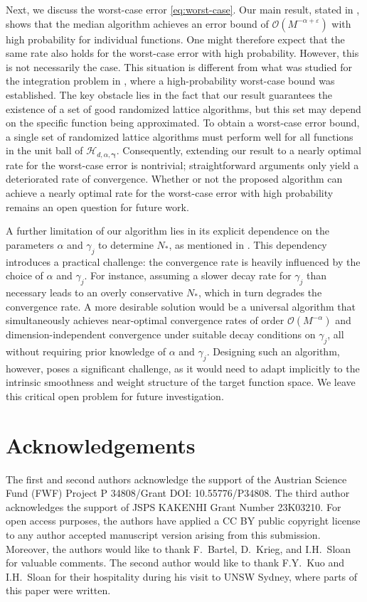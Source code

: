 \documentclass[pdflatex,sn-basic,Numbered]{sn-jnl}%
\newcommand{\bsgamma}{\boldsymbol{\gamma}}
\newcommand{\Hcal}{\mathcal{H}}
\theoremstyle{thmstyleone}%
\theoremstyle{thmstyletwo}%
\begin{document}
Next, we discuss the worst-case error \eqref{eq:worst-case}.
Our main result, stated in , shows that the median algorithm achieves an error bound of $\mathcal{O}(M^{-\alpha+\varepsilon})$ with high probability for individual functions. One might therefore expect that the same rate also holds for the worst-case error with high probability. However, this is not necessarily the case.
This situation is different from what was studied for the integration problem in \cite{goda2022free}, where a high-probability worst-case bound was established.
The key obstacle lies in the fact that our result guarantees the existence of a set of good randomized lattice algorithms, but this set may depend on the specific function being approximated. 
To obtain a worst-case error bound, a single set of randomized lattice algorithms must perform well for all functions in the unit ball of $\Hcal_{d,\alpha,\bsgamma}$. Consequently, extending our result to a nearly optimal rate for the worst-case error is nontrivial; straightforward arguments only yield a deteriorated rate of convergence.
Whether or not the proposed algorithm can achieve a nearly optimal rate for the worst-case error with high probability remains an open question for future work.

A further limitation of our algorithm lies in its explicit dependence on the parameters $\alpha$ and $\gamma_j$ to determine $N_*$, as mentioned in . This dependency introduces a practical challenge: the convergence rate is heavily influenced by the choice of $\alpha$ and $\gamma_j$. For instance, assuming a slower decay rate for $\gamma_j$ than necessary leads to an overly conservative $N_*$, which in turn degrades the convergence rate. A more desirable solution would be a universal algorithm that simultaneously achieves near-optimal convergence rates of order $\mathcal{O}(M^{-\alpha})$ and dimension-independent convergence under suitable decay conditions on $\gamma_j$, all without requiring prior knowledge of $\alpha$ and $\gamma_j$. Designing such an algorithm, however, poses a significant challenge, as it would need to adapt implicitly to the intrinsic smoothness and weight structure of the target function space. We leave this critical open problem for future investigation.

\section*{Acknowledgements}
The first and second authors acknowledge the support of the Austrian Science Fund (FWF) Project  P 34808/Grant DOI: 10.55776/P34808. The third author acknowledges the support of JSPS KAKENHI Grant Number 23K03210. For open access purposes, the authors have applied a CC BY public copyright license to any author accepted manuscript version arising from this submission. Moreover, the authors would like to thank F.~Bartel, D.~Krieg, and I.H.~Sloan for valuable comments. The second author would like to thank F.Y.~Kuo and I.H.~Sloan for their hospitality during his visit to UNSW Sydney, where parts of this paper were written. 
\end{document}
